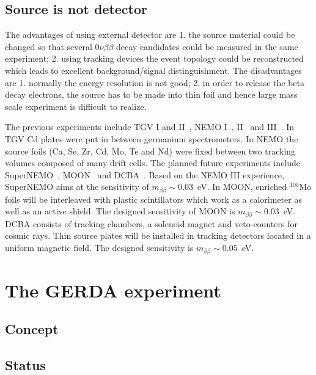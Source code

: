 \subsection{Source is not  detector}
\label{sec:gerda:sued}
The advantages of using external detector are 1. the source material could be changed so that several $0\nu\beta\beta$ decay candidates could be measured in the same experiment; 2. using tracking devices the event topology could be reconstructed which leads to excellent background/signal distinguishment. The disadvantages are 1. normally the energy resolution is not good; 2. in order to release the beta decay electrons, the source has to be made into thin foil and hence large mass scale experiment is difficult to realize.

The previous experiments include TGV I and II~\cite{Ste98, Ste00,   Ste06}, NEMO I~\cite{Das91}, II~\cite{Arn95} and III~\cite{Arn05,   Arn07}. In TGV Cd plates were put in between germanium spectrometers. In NEMO the source foils (Ca, Se, Zr, Cd, Mo, Te and Nd) were fixed between two tracking volumes composed of many drift cells. The planned future experiments include SuperNEMO~\cite{Sne08}, MOON~\cite{Nak06} and DCBA~\cite{Ish05}. Based on the NEMO III experience, SuperNEMO aims at the sensitivity of $m_{\beta\beta} \sim 0.03$~eV. In MOON, enriched $^{100}$Mo foils will be interleaved with plastic scintillators which work as a calorimeter as well as an active shield. The designed sensitivity of MOON is $m_{\beta\beta} \sim 0.03$~eV. DCBA consists of tracking chambers, a solenoid magnet and veto-counters for cosmic rays. Thin source plates will be installed in tracking detectors located in a uniform magnetic field. The designed sensitivity is $m_{\beta\beta} \sim 0.05$~eV.


\section{The GERDA experiment}
\label{sec:gerda:concept}

\subsection{Concept}
\label{sec:gerda:concept}

\subsection{Status}
\label{sec:gerda:status}


